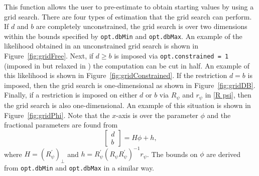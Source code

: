 \documentclass[10pt]{article}
\begin{document}
This function allows the user to pre-estimate to obtain starting values by using a grid search. There are four types of estimation that the grid search can perform. If $d$ and $b$ are completely unconstrained, the grid search is over two dimensions within the bounds specified by \verb|opt.dbMin| and \verb|opt.dbMax|. An example of the likelihood obtained in an unconstrained grid search is shown in Figure~\ref{fig:gridFree}. Next, if $d\ge b$ is imposed via \verb|opt.constrained = 1| (imposed in \cite{johansen2012likelihood} but relaxed in \cite{JN2018}) the computation can be cut in half. An example of this likelihood is shown in Figure~\ref{fig:gridConstrained}. If the restriction $d=b$ is imposed, then the grid search is one-dimensional as shown in Figure~\ref{fig:gridDB}. Finally, if a restriction is imposed on either $d$ or $b$ via $R_\psi$ and $r_\psi$ in \eqref{R psi}, then the grid search is also one-dimensional. An example of this situation is shown in Figure~\ref{fig:gridPhi}. Note that the $x$-axis is over the parameter $\phi$ and the fractional parameters are found from
\begin{equation}
  \begin{bmatrix}
    d \\ b
  \end{bmatrix}
  = H\phi + h,
\end{equation}
where $H = (R_{\psi}^{\prime})_\perp$ and $h = R_{\psi}^{\prime} (R_\psi R_{\psi}^{\prime})^{-1} r_\psi$. The bounds on $\phi$ are derived from \verb|opt.dbMin| and \verb|opt.dbMax| in a similar way.
\end{document}
